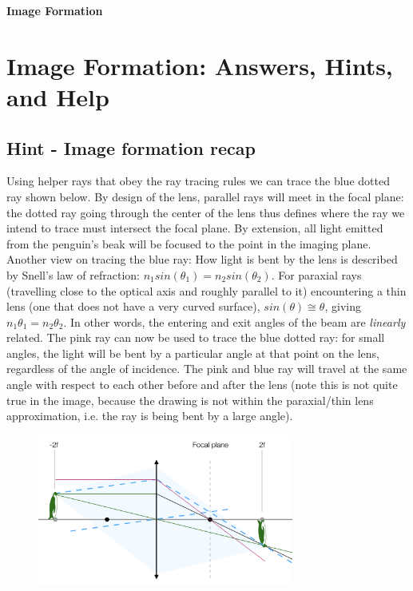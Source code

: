 \documentclass[a4paper]{report}
\begin{document}
	
	\setcounter{secnumdepth}{2}
	
	\begin{center}
		\textbf{\Large{Image Formation}}
	\end{center}
	

	\section{Image Formation: Answers, Hints, and Help}
	
    \subsection{Hint - Image formation recap}
	\hypertarget{hintTo-recap}{}
	Using helper rays that obey the ray tracing rules we can trace the blue dotted ray shown below. By design of the lens, parallel rays will meet in the focal plane: the dotted ray going through the center of the lens thus defines where the ray we intend to trace must intersect the focal plane. By extension, all light emitted from the penguin's beak will be focused to the point in the imaging plane.
	\\
	
	Another view on tracing the blue ray: How light is bent by the lens is described by Snell's law of refraction: $n_1 sin(\theta_1) = n_2 sin(\theta_2)$. For paraxial rays (travelling close to the optical axis and roughly parallel to it) encountering a thin lens (one that does not have a very curved surface), $sin(\theta)\cong\theta$, giving $n_1 \theta_1 = n_2 \theta_2$. In other words, the entering and exit angles of the beam are \emph{linearly} related. The pink ray can now be used to trace the blue dotted ray: for small angles, the light will be bent by a particular angle at that point on the lens, regardless of the angle of incidence. The pink and blue ray will travel at the same angle with respect to each other before and after the lens (note this is not quite true in the image, because the drawing is not within the paraxial/thin lens approximation, i.e. the ray is being bent by a large angle).
	
	\begin{figure}[h]
		\center
		\includegraphics[width=0.75\textwidth]{hint_ray_tracing.png}
		\label{hint_ray_tracing}
	\end{figure}
\end{document}

